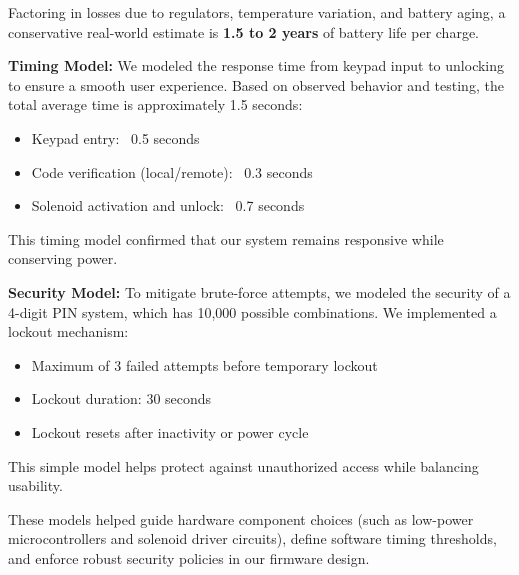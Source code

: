 Factoring in losses due to regulators, temperature variation, and battery aging, a conservative real-world estimate is \textbf{1.5 to 2 years} of battery life per charge.

\textbf{Timing Model:}  
We modeled the response time from keypad input to unlocking to ensure a smooth user experience. Based on observed behavior and testing, the total average time is approximately 1.5 seconds:
\begin{itemize}
    \item Keypad entry: ~0.5 seconds
    \item Code verification (local/remote): ~0.3 seconds
    \item Solenoid activation and unlock: ~0.7 seconds
\end{itemize}

This timing model confirmed that our system remains responsive while conserving power.

\textbf{Security Model:}  
To mitigate brute-force attempts, we modeled the security of a 4-digit PIN system, which has 10,000 possible combinations. We implemented a lockout mechanism:
\begin{itemize}
    \item Maximum of 3 failed attempts before temporary lockout
    \item Lockout duration: 30 seconds
    \item Lockout resets after inactivity or power cycle
\end{itemize}

This simple model helps protect against unauthorized access while balancing usability.

These models helped guide hardware component choices (such as low-power microcontrollers and solenoid driver circuits), define software timing thresholds, and enforce robust security policies in our firmware design.

